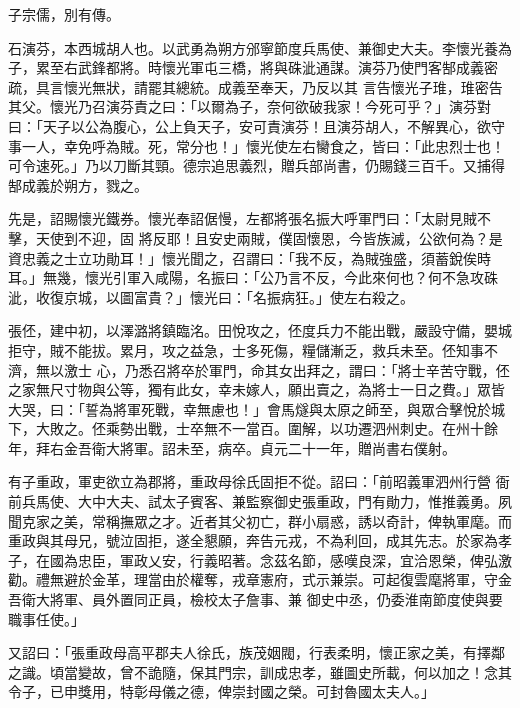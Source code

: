 \begin{pinyinscope}
 子宗儒，別有傳。



 石演芬，本西城胡人也。以武勇為朔方邠寧節度兵馬使、兼御史大夫。李懷光養為子，累至右武鋒都將。時懷光軍屯三橋，將與硃泚通謀。演芬乃使門客郜成義密疏，具言懷光無狀，請罷其總統。成義至奉天，乃反以其
 言告懷光子琟，琟密告其父。懷光乃召演芬責之曰：「以爾為子，奈何欲破我家！今死可乎？」演芬對曰：「天子以公為腹心，公上負天子，安可責演芬！且演芬胡人，不解異心，欲守事一人，幸免呼為賊。死，常分也！」懷光使左右臠食之，皆曰：「此忠烈士也！可令速死。」乃以刀斷其頸。德宗追思義烈，贈兵部尚書，仍賜錢三百千。又捕得郜成義於朔方，戮之。



 先是，詔賜懷光鐵券。懷光奉詔倨慢，左都將張名振大呼軍門曰：「太尉見賊不擊，天使到不迎，固
 將反耶！且安史兩賊，僕固懷恩，今皆族滅，公欲何為？是資忠義之士立功勛耳！」懷光聞之，召謂曰：「我不反，為賊強盛，須蓄銳俟時耳。」無幾，懷光引軍入咸陽，名振曰：「公乃言不反，今此來何也？何不急攻硃泚，收復京城，以圖富貴？」懷光曰：「名振病狂。」使左右殺之。



 張伾，建中初，以澤潞將鎮臨洺。田悅攻之，伾度兵力不能出戰，嚴設守備，嬰城拒守，賊不能拔。累月，攻之益急，士多死傷，糧儲漸乏，救兵未至。伾知事不濟，無以激士
 心，乃悉召將卒於軍門，命其女出拜之，謂曰：「將士辛苦守戰，伾之家無尺寸物與公等，獨有此女，幸未嫁人，願出賣之，為將士一日之費。」眾皆大哭，曰：「誓為將軍死戰，幸無慮也！」會馬燧與太原之師至，與眾合擊悅於城下，大敗之。伾乘勢出戰，士卒無不一當百。圍解，以功遷泗州刺史。在州十餘年，拜右金吾衛大將軍。詔未至，病卒。貞元二十一年，贈尚書右僕射。



 有子重政，軍吏欲立為郡將，重政母徐氏固拒不從。詔曰：「前昭義軍泗州行營
 衙前兵馬使、大中大夫、試太子賓客、兼監察御史張重政，門有勛力，惟推義勇。夙聞克家之美，常稱撫眾之才。近者其父初亡，群小扇惑，誘以奇計，俾執軍麾。而重政與其母兄，號泣固拒，遂全懇願，奔告元戎，不為利回，成其先志。於家為孝子，在國為忠臣，軍政乂安，行義昭著。念茲名節，感嘆良深，宜洽恩榮，俾弘激勸。禮無避於金革，理當由於權奪，戎章憲府，式示兼崇。可起復雲麾將軍，守金吾衛大將軍、員外置同正員，檢校太子詹事、兼
 御史中丞，仍委淮南節度使與要職事任使。」



 又詔曰：「張重政母高平郡夫人徐氏，族茂姻閥，行表柔明，懷正家之美，有擇鄰之識。頃當變故，曾不詭隨，保其門宗，訓成忠孝，雖圖史所載，何以加之！念其令子，已申獎用，特彰母儀之德，俾崇封國之榮。可封魯國太夫人。」




\end{pinyinscope}

